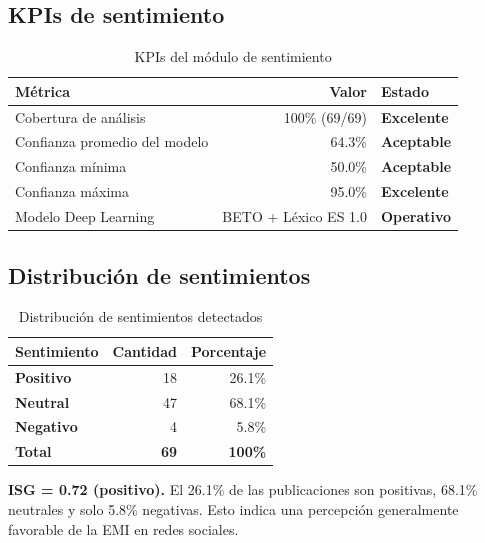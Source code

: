 \documentclass[11pt,a4paper]{article}
\begin{document}
\subsection{KPIs de sentimiento}

\begin{table}[H]
\centering
\begin{tabularx}{\textwidth}{X r l}
\toprule
\textbf{Métrica} & \textbf{Valor} & \textbf{Estado} \\
\midrule
Cobertura de análisis & 100\% (69/69) & \textcolor{successgreen}{\textbf{Excelente}} \\
\rowcolor{tablerow}
Confianza promedio del modelo & 64.3\% & \textcolor{warningorange}{\textbf{Aceptable}} \\
Confianza mínima & 50.0\% & \textcolor{warningorange}{\textbf{Aceptable}} \\
\rowcolor{tablerow}
Confianza máxima & 95.0\% & \textcolor{successgreen}{\textbf{Excelente}} \\
Modelo Deep Learning & BETO + Léxico ES 1.0 & \textcolor{successgreen}{\textbf{Operativo}} \\
\bottomrule
\end{tabularx}
\caption{KPIs del módulo de sentimiento}
\end{table}

\subsection{Distribución de sentimientos}

\begin{table}[H]
\centering
\begin{tabularx}{0.7\textwidth}{l r r}
\toprule
\textbf{Sentimiento} & \textbf{Cantidad} & \textbf{Porcentaje} \\
\midrule
\textcolor{successgreen}{\textbf{Positivo}} & 18 & 26.1\% \\
\rowcolor{tablerow}
\textcolor{emiblue}{\textbf{Neutral}} & 47 & 68.1\% \\
\textcolor{dangerred}{\textbf{Negativo}} & 4 & 5.8\% \\
\midrule
\textbf{Total} & \textbf{69} & \textbf{100\%} \\
\bottomrule
\end{tabularx}
\caption{Distribución de sentimientos detectados}
\end{table}

\begin{successbox}
\textbf{ISG = 0.72 (positivo).} El 26.1\% de las publicaciones son positivas, 68.1\% neutrales y solo 5.8\% negativas. Esto indica una percepción generalmente favorable de la EMI en redes sociales.
\end{successbox}
\end{document}
